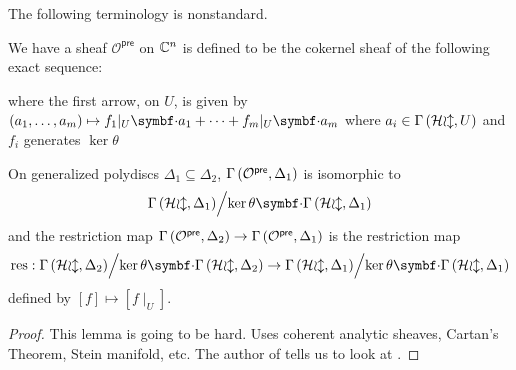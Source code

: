 The following terminology is nonstandard.
\begin{definition}\label{def:preanalytification-sheaf}
  We have a sheaf $\mathcal{O}^{\mathsf{pre}}$ on $\mathbb{C}^{n}$ is defined to be the cokernel sheaf of the following exact sequence:
	\begin{center}
	\end{center}
	where the first arrow, on $U$, is given by $(a_{1},\dots,a_{m}) \mapsto f_{1}|_{U}\smul a_{1}+\cdots+f_{m}|_{U}\smul a_{m}$ where $a_{i} \in {\Gamma\left(\ensuremath{\operatorname{\mathcal{Hol}}},U\right)}$ and $f_{i}$ generates $\ker\theta$
\end{definition}

\begin{lemma}
	On generalized polydiscs $\Delta_{1} \subseteq \Delta_{2}$, ${\Gamma\left(\mathcal{O}^{\mathsf{pre}},\Delta_{1}\right)}$ is isomorphic to \[\quotient{\sections{\sheafHol}{\Delta_{1}}}{\ker\theta\smul\sections{\sheafHol}{\Delta_{1}}}\] and the restriction map ${\Gamma\left({\mathcal{O}^{\mathsf{pre}}},\Delta_{2}\right)} \to {\Gamma\left({\mathcal{O}^{\mathsf{pre}}},\Delta_{1}\right)}$ is the restriction map
	\[
		\mathrm{res} :
		\quotient{\sections{\sheafHol}{\Delta_{2}}}{\ker\theta\smul\sections{\sheafHol}{\Delta_{2}}} \to
		\quotient{\sections{\sheafHol}{\Delta_{1}}}{\ker\theta\smul\sections{\sheafHol}{\Delta_{1}}}
	\]
	defined by $[f] \mapsto [f\mid_{U}]$.
\end{lemma}
\begin{proof}
	This lemma is going to be hard. Uses coherent analytic sheaves, Cartan's Theorem, Stein manifold, etc. The author of \cite[page~108]{neeman2007algebraic} tells us to look at \cite[page~136, definition 2; page 243, theorem 2]{gunning2022analytic}.
\end{proof}


